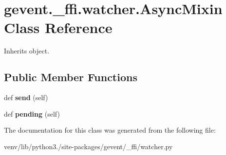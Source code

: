 \hypertarget{classgevent_1_1__ffi_1_1watcher_1_1_async_mixin}{}\section{gevent.\+\_\+ffi.\+watcher.\+Async\+Mixin Class Reference}
\label{classgevent_1_1__ffi_1_1watcher_1_1_async_mixin}


Inherits object.

\subsection*{Public Member Functions}
\begin{DoxyCompactItemize}
\item 
\mbox{\label{classgevent_1_1__ffi_1_1watcher_1_1_async_mixin_a85ac858c65a641812f8c32b07619204f}} 
def {\bfseries send} (self)
\item 
\mbox{\label{classgevent_1_1__ffi_1_1watcher_1_1_async_mixin_aba4e1a594e863ae8821ee85a1593acb1}} 
def {\bfseries pending} (self)
\end{DoxyCompactItemize}


The documentation for this class was generated from the following file\+:\begin{DoxyCompactItemize}
\item 
venv/lib/python3./site-\/packages/gevent/\+\_\+ffi/watcher.\+py\end{DoxyCompactItemize}
